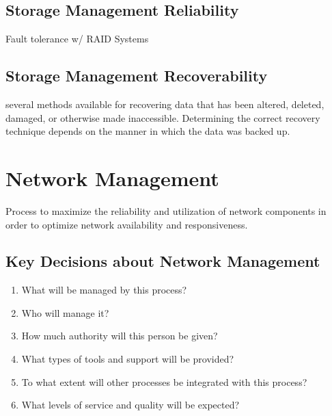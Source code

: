 \documentclass[a4]{article}
\newenvironment{Table}
   {\par\bigskip\noindent\minipage{\columnwidth}\centering}
   {\endminipage\par\bigskip}
\begin{document}
\begin{multicols}{3}
\subsection{Storage Management Reliability}
Fault tolerance w/ RAID Systems

\begin{Table}
\end{Table}

\subsection{Storage Management Recoverability}
several methods available for recovering data that has been altered, deleted, damaged, or otherwise made inaccessible.
Determining the correct recovery technique depends on the manner in which the data was backed up.

\section{Network Management}
Process to maximize the reliability and utilization of network components in order to optimize network availability 
and responsiveness.


\subsection{Key Decisions about Network Management}
\begin{enumerate}
\item What will be managed by this process?
\item Who will manage it?
\item How much authority will this person be given?
\item What types of tools and support will be provided?
\item To what extent will other processes be integrated with this process?
\item What levels of service and quality will be expected?
\end{enumerate}


\end{multicols}
\end{document}
